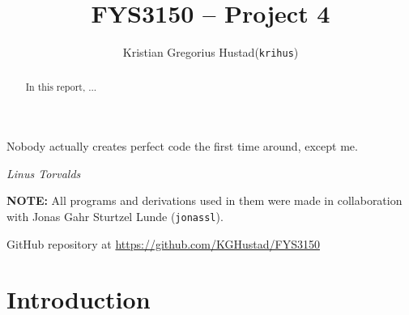 \documentclass[a4paper]{article}
\begin{document}
\title{FYS3150 -- Project 4}
\author{
    \begin{tabular}{r l}
        Kristian Gregorius Hustad & (\texttt{krihus})
    \end{tabular}}

\maketitle




\setlength{\epigraphwidth}{0.75\textwidth}
\renewcommand{\epigraphflush}{center}
\renewcommand{\beforeepigraphskip}{50pt}
\renewcommand{\afterepigraphskip}{100pt}
\renewcommand{\epigraphsize}{\normalsize}

\epigraph{Nobody actually creates perfect code the first time around, except me.}
{\textit{Linus Torvalds}}


\begin{abstract}
\noindent
In this report, ...
\end{abstract}

\vfill

\textbf{NOTE:} All programs and derivations used in them were made in collaboration with Jonas Gahr Sturtzel Lunde (\texttt{jonassl}).

\bigskip
\begin{center}
    GitHub repository at \url{https://github.com/KGHustad/FYS3150}
\end{center}

\newpage

\newcommand{\half}{\frac{1}{2}}
\newcommand{\dt}{{\Delta t}}
\newcommand{\dx}{{\Delta x}}
\newcommand{\bigO}{{\mathcal{O}}}

\newcommand{\stateset}{{\mathcal{S}}}
\newcommand{\expectation}[1]{{\langle #1 \rangle}}

\newcommand{\upspin}{\uparrow}
\newcommand{\downspin}{{\color{red}\downarrow}}




\section{Introduction}\label{sec:intro}
\cite{mhj_lecture_notes} %
\end{document}
